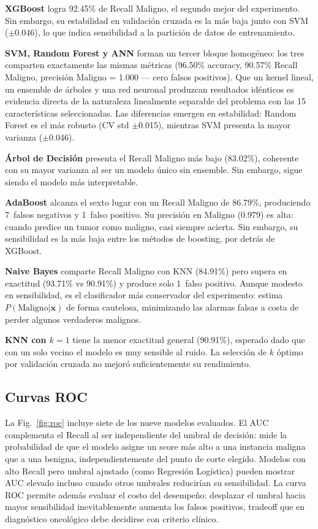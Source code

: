 \documentclass[journal]{IEEEtran}
\begin{document}
\textbf{XGBoost} logra 92.45\% de Recall Maligno, el segundo mejor del experimento. Sin embargo, su estabilidad en validación cruzada es la más baja junto con SVM ($\pm$0.046), lo que indica sensibilidad a la partición de datos de entrenamiento.

\textbf{SVM, Random Forest y ANN} forman un tercer bloque homogéneo: los tres comparten exactamente las mismas métricas (96.50\% accuracy, 90.57\% Recall Maligno, precisión Maligno = 1.000 — cero falsos positivos). Que un kernel lineal, un ensemble de árboles y una red neuronal produzcan resultados idénticos es evidencia directa de la naturaleza linealmente separable del problema con las 15 características seleccionadas. Las diferencias emergen en estabilidad: Random Forest es el más robusto (CV std $\pm$0.015), mientras SVM presenta la mayor varianza ($\pm$0.046).

\textbf{Árbol de Decisión} presenta el Recall Maligno más bajo (83.02\%), coherente con su mayor varianza al ser un modelo único sin ensemble. Sin embargo, sigue siendo el modelo más interpretable.

\textbf{AdaBoost} alcanza el sexto lugar con un Recall Maligno de 86.79\%, produciendo 7~falsos negativos y 1~falso positivo. Su precisión en Maligno (0.979) es alta: cuando predice un tumor como maligno, casi siempre acierta. Sin embargo, su sensibilidad es la más baja entre los métodos de boosting, por detrás de XGBoost.

\textbf{Naive Bayes} comparte Recall Maligno con KNN (84.91\%) pero supera en exactitud (93.71\% vs 90.91\%) y produce solo 1~falso positivo. Aunque modesto en sensibilidad, es el clasificador más conservador del experimento: estima $P(\text{Maligno}|\mathbf{x})$ de forma cautelosa, minimizando las alarmas falsas a costa de perder algunos verdaderos malignos.

\textbf{KNN con $k=1$} tiene la menor exactitud general (90.91\%), esperado dado que con un solo vecino el modelo es muy sensible al ruido. La selección de $k$ óptimo por validación cruzada no mejoró suficientemente su rendimiento.

\subsection{Curvas ROC}

La Fig.~\ref{fig:roc} incluye siete de los nueve modelos evaluados. El AUC complementa el Recall al ser independiente del umbral de decisión: mide la probabilidad de que el modelo asigne un score más alto a una instancia maligna que a una benigna, independientemente del punto de corte elegido. Modelos con alto Recall pero umbral ajustado (como Regresión Logística) pueden mostrar AUC elevado incluso cuando otros umbrales reducirían su sensibilidad. La curva ROC permite además evaluar el costo del desempeño: desplazar el umbral hacia mayor sensibilidad inevitablemente aumenta los falsos positivos, tradeoff que en diagnóstico oncológico debe decidirse con criterio clínico.
\end{document}
